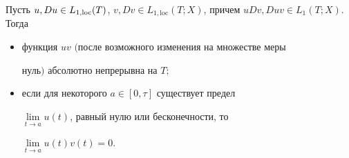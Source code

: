 \begin{lems}\label{Lim}


Пусть $u, D u \in L_{1,{\rm loc}}(T)$, $v, D v \in L_{1,\mathrm


{loc}}(T;X)$, причем $u D v, D u v \in L_1(T;X)$. Тогда


\begin{itemize}


\item[1)] функция $u v$ $($после возможного изменения на множестве меры


нуль\/$)$ абсолютно непрерывна на $T;$


\item[2)] если для некоторого $a \in [0,\tau]$ существует предел


$\lim\limits_{t\to a}u(t)$, равный нулю или бесконечности, то


$\lim\limits_{t\to a}u(t)v(t)=0$.


\end{itemize}


\end{lems}





